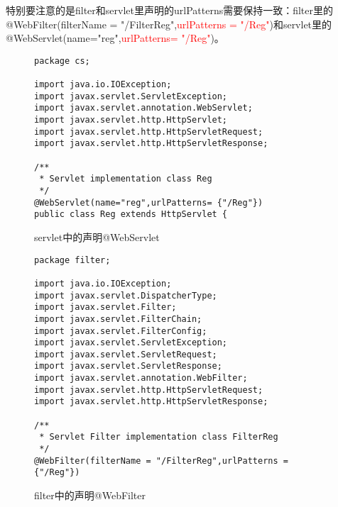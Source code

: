 特别要注意的是filter和servlet里声明的urlPatterns需要保持一致：filter里的@WebFilter(filterName = "/FilterReg",\textcolor{red}{urlPatterns = {"/Reg"}})和servlet里的@WebServlet(name="reg",\textcolor{red}{urlPatterns= {"/Reg"}})。
\begin{figure}
\begin{lstlisting}
package cs;

import java.io.IOException;
import javax.servlet.ServletException;
import javax.servlet.annotation.WebServlet;
import javax.servlet.http.HttpServlet;
import javax.servlet.http.HttpServletRequest;
import javax.servlet.http.HttpServletResponse;

/**
 * Servlet implementation class Reg
 */
@WebServlet(name="reg",urlPatterns= {"/Reg"})
public class Reg extends HttpServlet {
\end{lstlisting}
\caption{servlet中的声明@WebServlet}
\label{webServlet}
\end{figure}
\begin{figure}
\begin{lstlisting}
package filter;

import java.io.IOException;
import javax.servlet.DispatcherType;
import javax.servlet.Filter;
import javax.servlet.FilterChain;
import javax.servlet.FilterConfig;
import javax.servlet.ServletException;
import javax.servlet.ServletRequest;
import javax.servlet.ServletResponse;
import javax.servlet.annotation.WebFilter;
import javax.servlet.http.HttpServletRequest;
import javax.servlet.http.HttpServletResponse;

/**
 * Servlet Filter implementation class FilterReg
 */
@WebFilter(filterName = "/FilterReg",urlPatterns = {"/Reg"})
\end{lstlisting}
\caption{filter中的声明@WebFilter}
\label{webFilter}
\end{figure}

